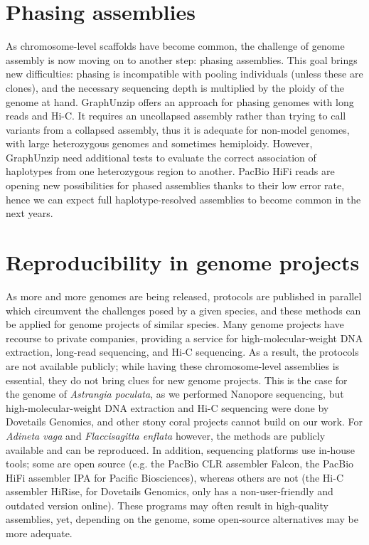 \section{Phasing assemblies}

As chromosome-level scaffolds have become common, the challenge of genome assembly is now moving on to another step: phasing assemblies. This goal brings new difficulties: phasing is incompatible with pooling individuals (unless these are clones), and the necessary sequencing depth is multiplied by the ploidy of the genome at hand. GraphUnzip offers an approach for phasing genomes with long reads and Hi-C. It requires an uncollapsed assembly rather than trying to call variants from a collapsed assembly, thus it is adequate for non-model genomes, with large heterozygous genomes and sometimes hemiploidy. However, GraphUnzip need additional tests to evaluate the correct association of haplotypes from one heterozygous region to another. PacBio HiFi reads are opening new possibilities for phased assemblies thanks to their low error rate, hence we can expect full haplotype-resolved assemblies to become common in the next years. \\

\section{Reproducibility in genome projects}

As more and more genomes are being released, protocols are published in parallel which circumvent the challenges posed by a given species, and these methods can be applied for genome projects of similar species. Many genome projects have recourse to private companies, providing a service for high-molecular-weight DNA extraction, long-read sequencing, and Hi-C sequencing. As a result, the protocols are not available publicly; while having these chromosome-level assemblies is essential, they do not bring clues for new genome projects. This is the case for the genome of \textit{Astrangia poculata}, as we performed Nanopore sequencing, but high-molecular-weight DNA extraction and Hi-C sequencing were done by Dovetails Genomics, and other stony coral projects cannot build on our work. For \textit{Adineta vaga} and \textit{Flaccisagitta enflata} however, the methods are publicly available and can be reproduced. In addition, sequencing platforms use in-house tools; some are open source (e.g. the PacBio CLR assembler Falcon, the PacBio HiFi assembler IPA for Pacific Biosciences), whereas others are not (the Hi-C assembler HiRise, for Dovetails Genomics, only has a non-user-friendly and outdated version online). These programs may often result in high-quality assemblies, yet, depending on the genome, some open-source alternatives may be more adequate. \\

